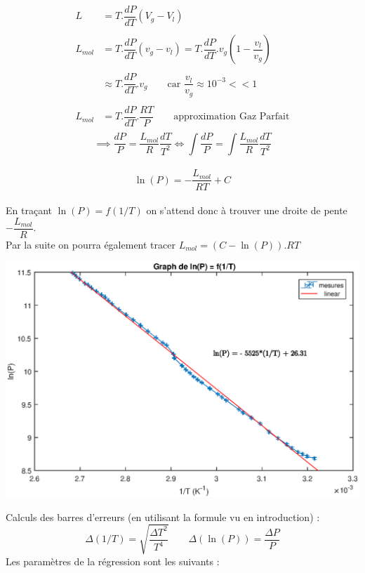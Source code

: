 \documentclass[12pt,a4paper]{article}
\begin{document}
\begin{itemize}
\begin{align*}
L&=T.\dfrac{dP}{dT}(V_g - V_l)\\ \\
%
L_{mol}&=T.\dfrac{dP}{dT}(v_g - v_l)=T.\dfrac{dP}{dT}.v_g(1 - \dfrac{v_l}{v_g})\\ \\
%
&\approx T.\dfrac{dP}{dT}.v_g \qquad \text{car } \dfrac{v_l}{v_g} \approx 10^{-3} << 1\\ \\
%
L_{mol}&=T.\dfrac{dP}{dT}.\dfrac{RT}{P} \qquad \text{approximation Gaz Parfait}\\
\end{align*}
$$\implies \dfrac {dP} {P}=\dfrac {L_{mol}} {R}\dfrac {dT} {T^{2}} \iff \int\dfrac {dP} {P}=\int\dfrac {L_{mol}} {R}\dfrac {dT} {T^{2}}  $$\\
$$\boxed{\ln(P)=-\dfrac{L_{mol}}{RT}+C}$$\\
En traçant $\ln(P)=f(1/T) $ on s'attend donc à trouver une droite de pente $-\dfrac{L_{mol}}{R}$.\\
Par la suite on pourra également tracer $L_{mol}=(C-\ln(P)).RT$
\begin{bigcenter}
\includegraphics[scale=0.8]{lnp}
\end{bigcenter}
Calculs des barres d'erreurs (en utilisant la formule vu en introduction) :\\
$$\Delta(1/T)=\sqrt{\dfrac{\Delta T^2}{T^4}}\qquad \Delta(\ln(P))=\dfrac {\Delta P} {P}$$
Les paramètres de la régression sont les suivants :\\
\linebreak
\vspace{2mm}


\end{itemize}
\end{document}
